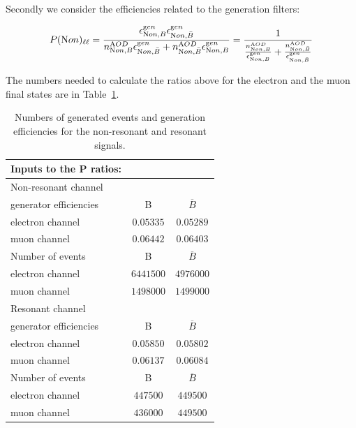 Secondly we consider the efficiencies related to the generation
filters:

\begin{align}
  P({\textrm Non})_{\ell\ell} = \frac{\epsilon^{\textrm gen}_{{\textrm Non},B}\epsilon^{\textrm gen}_{{\textrm Non},\bar{B}}}{n_{{\textrm Non},B}^{\textrm AOD}\epsilon^{\textrm gen}_{{\textrm Non},\bar{B}} + n_{{\textrm Non},\bar{B}}^{\textrm AOD}\epsilon^{\textrm gen}_{{\textrm Non},B}} =
  \frac{1}{\frac{n_{{\textrm Non},B}^{\textrm AOD}}{\epsilon^{\textrm gen}_{{\textrm Non},B}}+\frac{n_{{\textrm Non},\bar{B}}^{\textrm AOD}}{\epsilon^{\textrm gen}_{{\textrm Non},\bar{B}}}}
\end{align}

The numbers needed to calculate the ratios above for the electron
and the muon final states are in Table~\ref{tab:generation}.

\begin{table}[!tbp]
\begin{center}
\smallskip
\begin{tabular}{|l|c|c|} 
\hline
Inputs to the P ratios: & & \\
\hline
Non-resonant channel & & \\
\hline
\hline
generator efficiencies & B & $\overline{B}$ \\
\hline
electron channel & $0.05335$ & $0.05289$ \\
muon channel & $0.06442$ & $0.06403$ \\
\hline
Number of events & B & $\overline{B}$ \\
\hline
electron channel & $6441500$ & $4976000$ \\
muon channel & $1498000$ & $1499000$ \\
\hline
\hline
Resonant channel & & \\
\hline
\hline
generator efficiencies & B & $\overline{B}$ \\
\hline
electron channel & $0.05850$ & $0.05802$ \\
muon channel & $0.06137$ & $0.06084$ \\
\hline
Number of events & B & $\overline{B}$ \\
\hline
electron channel & $447500$ & $449500$ \\
muon channel & $436000$ & $449500$ \\
\hline
\end{tabular}
\caption{Numbers of generated events and generation efficiencies for
the non-resonant and resonant signals.}
\label{tab:generation}
\end{center}
\end{table}

